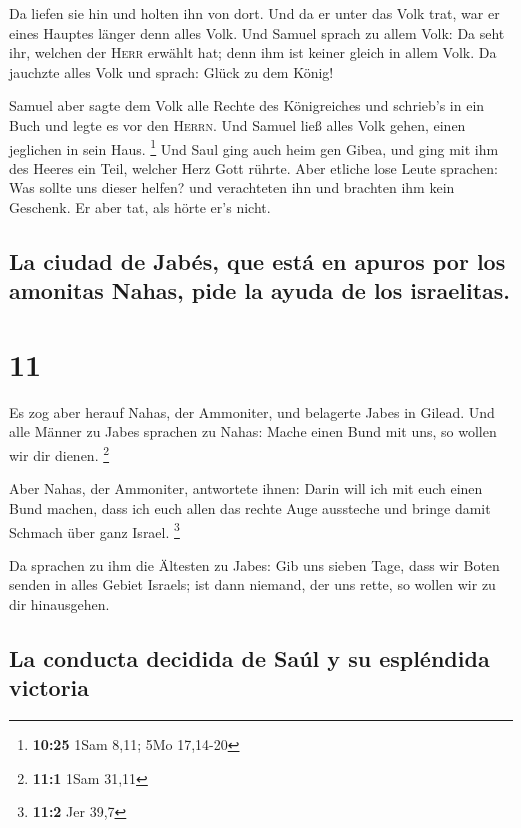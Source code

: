  Da liefen sie hin und holten ihn von dort. Und da er
unter das Volk trat, war er eines Hauptes länger denn alles Volk.
 Und Samuel sprach zu allem Volk: Da seht ihr, welchen
der \textsc{Herr} erwählt hat; denn ihm ist keiner gleich in allem Volk.
Da jauchzte alles Volk und sprach: Glück zu dem König!

 Samuel aber sagte dem Volk alle Rechte des Königreiches
und schrieb's in ein Buch und legte es vor den \textsc{Herrn}. Und
Samuel ließ alles Volk gehen, einen jeglichen in sein Haus. \footnote{\textbf{10:25}
  1Sam 8,11; 5Mo 17,14-20}  Und Saul ging auch heim gen
Gibea, und ging mit ihm des Heeres ein Teil, welcher Herz Gott rührte.
 Aber etliche lose Leute sprachen: Was sollte uns dieser
helfen? und verachteten ihn und brachten ihm kein Geschenk. Er aber tat,
als hörte er's nicht.

\hypertarget{la-ciudad-de-jabuxe9s-que-estuxe1-en-apuros-por-los-amonitas-nahas-pide-la-ayuda-de-los-israelitas.}{%
\subsection{La ciudad de Jabés, que está en apuros por los amonitas
Nahas, pide la ayuda de los
israelitas.}\label{la-ciudad-de-jabuxe9s-que-estuxe1-en-apuros-por-los-amonitas-nahas-pide-la-ayuda-de-los-israelitas.}}

\hypertarget{section-10}{%
\section{11}\label{section-10}}

 Es zog aber herauf Nahas, der Ammoniter, und belagerte
Jabes in Gilead. Und alle Männer zu Jabes sprachen zu Nahas: Mache einen
Bund mit uns, so wollen wir dir dienen. \footnote{\textbf{11:1} 1Sam
  31,11}

 Aber Nahas, der Ammoniter, antwortete ihnen: Darin will
ich mit euch einen Bund machen, dass ich euch allen das rechte Auge
aussteche und bringe damit Schmach über ganz Israel. \footnote{\textbf{11:2}
  Jer 39,7}

 Da sprachen zu ihm die Ältesten zu Jabes: Gib uns sieben
Tage, dass wir Boten senden in alles Gebiet Israels; ist dann niemand,
der uns rette, so wollen wir zu dir hinausgehen.

\hypertarget{la-conducta-decidida-de-sauxfal-y-su-espluxe9ndida-victoria}{%
\subsection{La conducta decidida de Saúl y su espléndida
victoria}\label{la-conducta-decidida-de-sauxfal-y-su-espluxe9ndida-victoria}}

